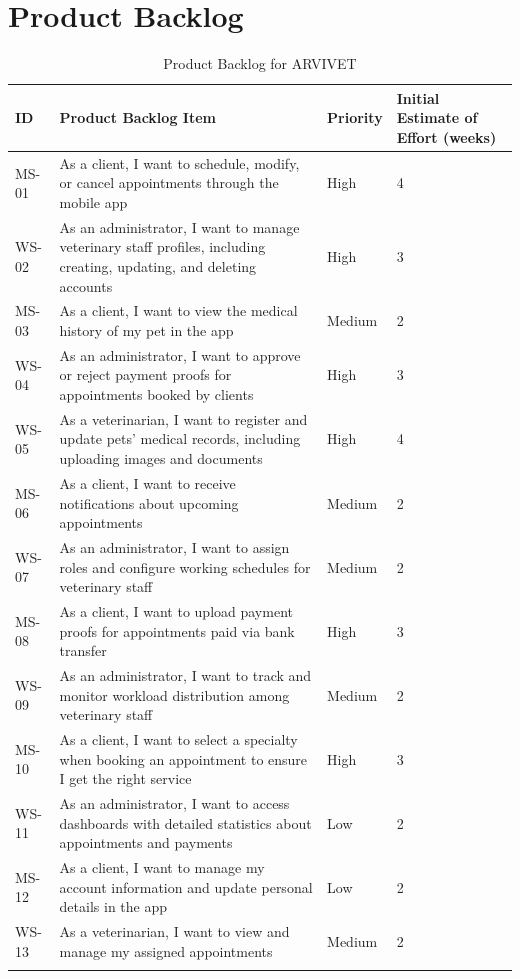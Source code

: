 \documentclass[a4paper,12pt]{report}
\begin{document}
	
	\section{Product Backlog}
	\begin{longtable}{|p{2cm}|p{8cm}|p{3cm}|p{3cm}|}
		\hline
		\textbf{ID} & \textbf{Product Backlog Item} & \textbf{Priority} & \textbf{Initial Estimate of Effort (weeks)} \\
		\hline
		MS-01 & As a client, I want to schedule, modify, or cancel appointments through the mobile app & High & 4 \\
		\hline
		WS-02 & As an administrator, I want to manage veterinary staff profiles, including creating, updating, and deleting accounts & High & 3 \\
		\hline
		MS-03 & As a client, I want to view the medical history of my pet in the app & Medium & 2 \\
		\hline
		WS-04 & As an administrator, I want to approve or reject payment proofs for appointments booked by clients & High & 3 \\
		\hline
		WS-05 & As a veterinarian, I want to register and update pets' medical records, including uploading images and documents & High & 4 \\
		\hline
		MS-06 & As a client, I want to receive notifications about upcoming appointments & Medium & 2 \\
		\hline
		WS-07 & As an administrator, I want to assign roles and configure working schedules for veterinary staff & Medium & 2 \\
		\hline
		MS-08 & As a client, I want to upload payment proofs for appointments paid via bank transfer & High & 3 \\
		\hline
		WS-09 & As an administrator, I want to track and monitor workload distribution among veterinary staff & Medium & 2 \\
		\hline
		MS-10 & As a client, I want to select a specialty when booking an appointment to ensure I get the right service & High & 3 \\
		\hline
		WS-11 & As an administrator, I want to access dashboards with detailed statistics about appointments and payments & Low & 2 \\
		\hline
		MS-12 & As a client, I want to manage my account information and update personal details in the app & Low & 2 \\
		\hline
		WS-13 & As a veterinarian, I want to view and manage my assigned appointments & Medium & 2 \\
		\hline
		\caption{Product Backlog for ARVIVET 
			\label{tab:arvivet_product_backlog}}
	\end{longtable}
	
\end{document}
